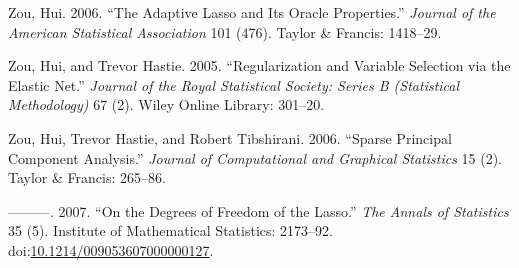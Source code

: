 \documentclass[article]{jss}
\begin{document}
\hypertarget{ref-zou2006adaptive}{}
Zou, Hui. 2006. ``The Adaptive Lasso and Its Oracle Properties.''
\emph{Journal of the American Statistical Association} 101 (476). Taylor
\& Francis: 1418--29.

\hypertarget{ref-zou2005regularization}{}
Zou, Hui, and Trevor Hastie. 2005. ``Regularization and Variable
Selection via the Elastic Net.'' \emph{Journal of the Royal Statistical
Society: Series B (Statistical Methodology)} 67 (2). Wiley Online
Library: 301--20.

\hypertarget{ref-zou2006sparse}{}
Zou, Hui, Trevor Hastie, and Robert Tibshirani. 2006. ``Sparse Principal
Component Analysis.'' \emph{Journal of Computational and Graphical
Statistics} 15 (2). Taylor \& Francis: 265--86.

\hypertarget{ref-Zou2007}{}
---------. 2007. ``On the Degrees of Freedom of the Lasso.'' \emph{The
Annals of Statistics} 35 (5). Institute of Mathematical Statistics:
2173--92.
doi:\href{https://doi.org/10.1214/009053607000000127}{10.1214/009053607000000127}.
\end{document}
